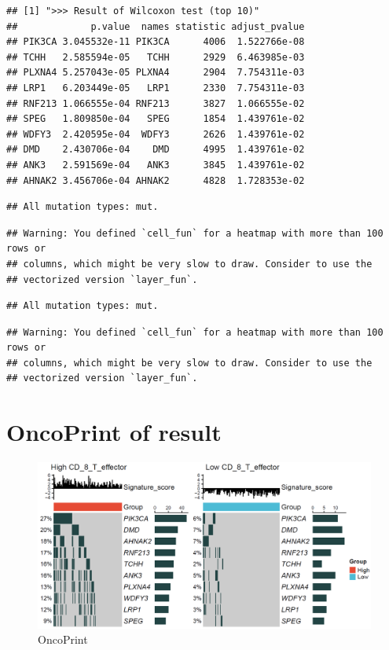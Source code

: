 \documentclass[
  12pt,
]{book}
\begin{document}
\begin{verbatim}
## [1] ">>> Result of Wilcoxon test (top 10)"
##             p.value  names statistic adjust_pvalue
## PIK3CA 3.045532e-11 PIK3CA      4006  1.522766e-08
## TCHH   2.585594e-05   TCHH      2929  6.463985e-03
## PLXNA4 5.257043e-05 PLXNA4      2904  7.754311e-03
## LRP1   6.203449e-05   LRP1      2330  7.754311e-03
## RNF213 1.066555e-04 RNF213      3827  1.066555e-02
## SPEG   1.809850e-04   SPEG      1854  1.439761e-02
## WDFY3  2.420595e-04  WDFY3      2626  1.439761e-02
## DMD    2.430706e-04    DMD      4995  1.439761e-02
## ANK3   2.591569e-04   ANK3      3845  1.439761e-02
## AHNAK2 3.456706e-04 AHNAK2      4828  1.728353e-02
\end{verbatim}

\begin{verbatim}
## All mutation types: mut.
\end{verbatim}

\begin{verbatim}
## Warning: You defined `cell_fun` for a heatmap with more than 100 rows or
## columns, which might be very slow to draw. Consider to use the
## vectorized version `layer_fun`.
\end{verbatim}

\begin{verbatim}
## All mutation types: mut.
\end{verbatim}

\begin{verbatim}
## Warning: You defined `cell_fun` for a heatmap with more than 100 rows or
## columns, which might be very slow to draw. Consider to use the
## vectorized version `layer_fun`.
\end{verbatim}

\hypertarget{oncoprint-of-result}{%
\section{OncoPrint of result}\label{oncoprint-of-result}}

\begin{figure}

{\centering \includegraphics[width=0.95\linewidth]{./fig/0-OncoPrint-CD_8_T_effector} 

}

\caption{OncoPrint}\label{fig:unnamed-chunk-6}
\end{figure}
\end{document}
